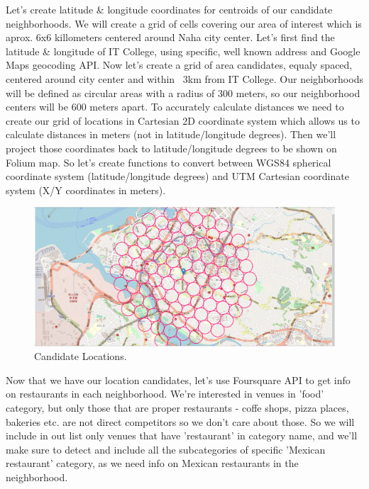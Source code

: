 \documentclass[11pt]{article}
\begin{document}
Let's create latitude \& longitude coordinates for centroids of our candidate neighborhoods. We will create a grid of cells covering our area of interest which is aprox. 6x6 killometers centered around Naha city center.
\newline
Let's first find the latitude \& longitude of IT College, using specific, well known address and Google Maps geocoding API.
\newline
Now let's create a grid of area candidates, equaly spaced, centered around city center and within ~3km from IT College. Our neighborhoods will be defined as circular areas with a radius of 300 meters, so our neighborhood centers will be 600 meters apart.
\newline
To accurately calculate distances we need to create our grid of locations in Cartesian 2D coordinate system which allows us to calculate distances in meters (not in latitude/longitude degrees). Then we'll project those coordinates back to latitude/longitude degrees to be shown on Folium map. So let's create functions to convert between WGS84 spherical coordinate system (latitude/longitude degrees) and UTM Cartesian coordinate system (X/Y coordinates in meters).
\newline

\begin{figure}[H]
    \centering
        \includegraphics[scale=.3]{figures/cm1.png}
    \caption{Candidate Locations.}
    \label{fig:1}
\end{figure}

Now that we have our location candidates, let's use Foursquare API to get info on restaurants in each neighborhood.
\newline
We're interested in venues in 'food' category, but only those that are proper restaurants - coffe shops, pizza places, bakeries etc. are not direct competitors so we don't care about those. So we will include in out list only venues that have 'restaurant' in category name, and we'll make sure to detect and include all the subcategories of specific 'Mexican restaurant' category, as we need info on Mexican restaurants in the neighborhood.
\newline
\end{document}
